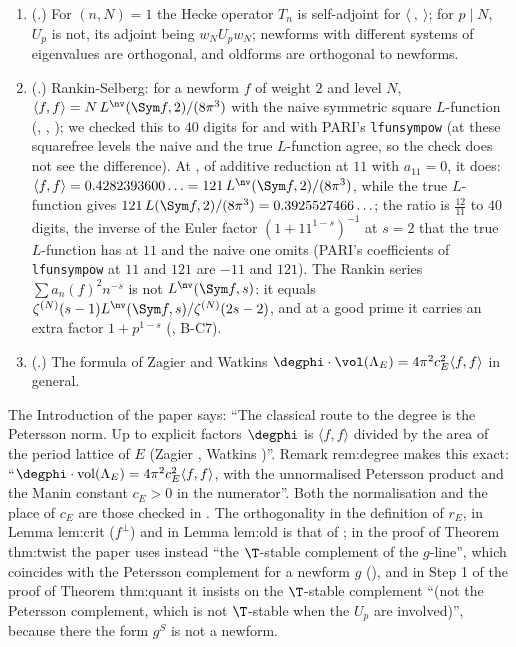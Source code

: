 \begin{remark}\label{rem:modforms:petersson-forward}
\begin{enumerate}[label=(\alph*)]
\item (.) For $(n,N)=1$ the Hecke operator $T_n$ is self-adjoint for $\langle\ ,\ \rangle$; for $p\mid N$, $U_p$ is not, its adjoint being $w_NU_pw_N$; newforms with different
systems of eigenvalues are orthogonal, and oldforms are orthogonal to newforms.
\item (.) Rankin-Selberg: for a newform $f$ of weight $2$ and level $N$, $\langle f,f\rangle=N\,L^{\nv}(\Sym f,2)/(8\pi^3)$ with the naive symmetric square
$L$-function (\cite[Lemma 2.12]{DFG04}, \cite{Shimura76}, \cite{Rankin39}); we checked this to $40$ digits for  and  with PARI's \texttt{lfunsympow} (at these squarefree levels the naive and the true $L$-function agree, so the check does not see the difference).
At , of additive reduction at $11$ with $a_{11}=0$, it does: $\langle f,f\rangle=0.4282393600\ldots=121\,L^{\nv}(\Sym f,2)/(8\pi^3)$, while the true $L$-function gives
$121\,L(\Sym f,2)/(8\pi^3)=0.3925527466\ldots$; the ratio is $\frac{12}{11}$ to $40$ digits, the inverse of the Euler factor $(1+11^{1-s})^{-1}$ at $s=2$ that the true $L$-function has at $11$ and
the naive one omits (PARI's coefficients of \texttt{lfunsympow} at $11$ and $121$ are $-11$ and $121$). The Rankin
series $\sum a_n(f)^2n^{-s}$ is not $L^{\nv}(\Sym f,s)$: it equals $\zeta^{(N)}(s-1)L^{\nv}(\Sym f,s)/\zeta^{(N)}(2s-2)$, and at a good prime it carries an extra factor $1+p^{1-s}$
(, B-C7).
\item (.) The formula of Zagier and Watkins $\degphi\cdot\vol(\Lambda_E)=4\pi^2c_E^2\langle f,f\rangle$ in general.
\end{enumerate}
\end{remark}

\begin{paperlink}\label{pl:modforms:petersson}
The Introduction of the paper says: ``The classical route to the degree is the Petersson norm. Up to explicit factors $\degphi$ is $\langle f,f\rangle$ divided by the area of the
period lattice of $E$ (Zagier \cite{Zagier85}, Watkins \cite{Watkins02})''. Remark rem:degree makes this exact: ``$\degphi\cdot\operatorname{vol}(\Lambda_E)=4\pi^2c_E^2\langle f,f\rangle$, with the
unnormalised Petersson product and the Manin constant $c_E>0$ in the numerator''. Both the normalisation and the place of $c_E$ are those checked in
. The orthogonality in the definition of $r_E$, in Lemma lem:crit ($f^\perp$) and in Lemma lem:old is that of
; in the proof of Theorem thm:twist the paper uses instead ``the $\T$-stable complement of the $g$-line'', which coincides with the Petersson
complement for a newform $g$ (), and in Step 1 of the proof of Theorem thm:quant it insists on the $\T$-stable complement ``(not the Petersson complement, which is not
$\T$-stable when the $U_p$ are involved)'', because there the form $g^S$ is not a newform.
\end{paperlink}

